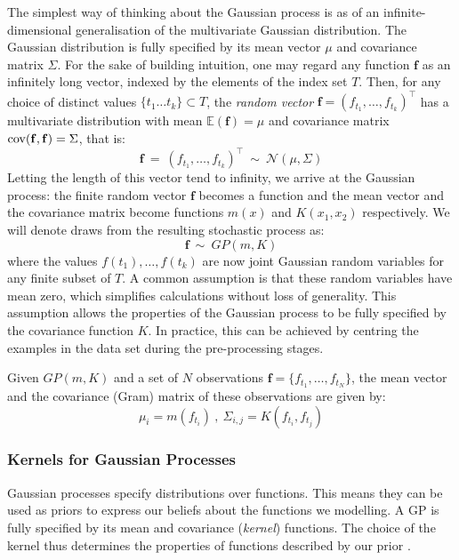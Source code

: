 \documentclass[a4paper,12pt ]{report}
\newcommand{\ex}{\mathbb{E}}
\renewcommand{\GP}{{GP}}
\begin{document}
The simplest way of thinking about the Gaussian process is as of an infinite-dimensional generalisation of the multivariate Gaussian distribution. The Gaussian distribution is fully specified by its mean vector $\mu$ and covariance matrix $\Sigma$. For the sake of building intuition, one may regard any function $\mathbf{f}$ as an infinitely long vector, indexed by the elements of the index set $T$. Then, for any choice of distinct values $\{t_1 \ldots t_k\} \subset T$, the \emph{random vector} $ \mathbf{f} = (f_{t_1}, \ldots, f_{t_k})^\top $ has a multivariate distribution with mean $\ex(\mathbf{f}) = \mu $ and covariance matrix $\operatorname{cov}(\mathbf{f}, \mathbf{f}) = \Sigma$, that is:
\begin{equation*} \mathbf{f} ~ = ~ (f_{t_1}, \ldots, f_{t_k} )^\top ~ \sim ~ \mathcal{N}(\mu, \Sigma) \end{equation*}
Letting the length of this vector tend to infinity, we arrive at the Gaussian process: the finite random vector $\mathbf{f}$ becomes a function and the mean vector and the covariance matrix become functions $m(x)$ and $K(x_1, x_2)$ respectively. We will denote draws from the resulting stochastic process as:
\begin{equation*} \mathbf{f} ~ \sim ~ \GP(m, K) \end{equation*}
where the values ${f(t_1), \ldots, f(t_k)}$ are now joint Gaussian random variables for any finite subset of $T$. A common assumption is that these random variables have mean zero, which simplifies calculations without loss of generality. This assumption allows the properties of the Gaussian process to be fully specified by the covariance function $K$. In practice, this can be achieved by centring the examples in the data set during the pre-processing stages.

Given $\GP(m, K)$ and a set of $N$ observations $ \mathbf{f} = \{f_{t_1}, \ldots, f_{t_N}\} $, the mean vector and the covariance (Gram) matrix of these observations are given by:
\begin{equation*}  \mu_i = m(f_{t_i}) ~,~  \Sigma_{i,j} = K(f_{t_i}, f_{t_j})  \end{equation*}

\subsubsection*{Kernels for Gaussian Processes}

Gaussian processes specify distributions over functions. This means they can be used as priors to express our beliefs about the functions we modelling. A {\GP} is fully specified by its mean and covariance (\emph{kernel}) functions. The choice of the kernel thus determines the properties of functions described by our prior \cite{rasmussen06}.
\end{document}
